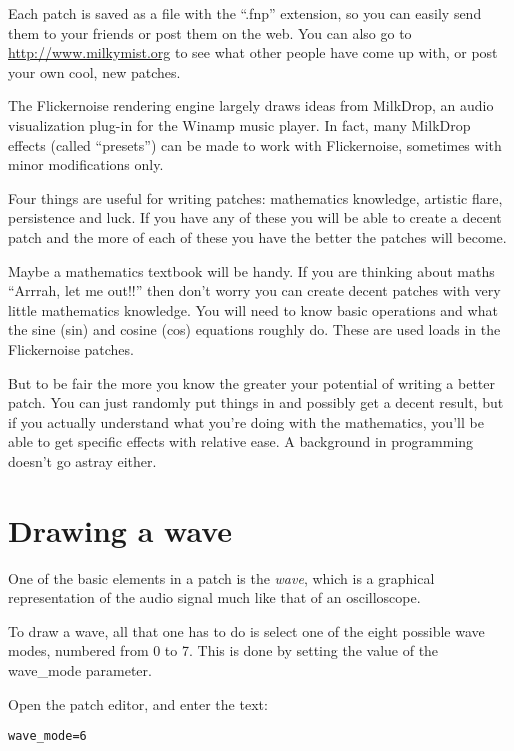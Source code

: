 \documentclass[11pt, a5paper, pagesize]{scrbook}
\begin{document}
Each patch is saved as a file with the ``.fnp'' extension, so you can easily send them to your friends or post them on the web. You can also go to \url{http://www.milkymist.org} to see what other people have come up with, or post your own cool, new patches.

The Flickernoise rendering engine largely draws ideas from MilkDrop, an audio visualization plug-in for the Winamp music player. In fact, many MilkDrop effects (called ``presets'') can be made to work with Flickernoise, sometimes with minor modifications only.

Four things are useful for writing patches: mathematics knowledge, artistic flare, persistence and luck. If you have any of these you will be able to create a decent patch and the more of each of these you have the better the patches will become. 

Maybe a mathematics textbook will be handy. If you are thinking about maths ``Arrrah, let me out!!'' then don't worry you can create decent patches with very little mathematics knowledge. You will need to know basic operations and what the sine (sin) and cosine (cos) equations roughly do. These are used loads in the Flickernoise patches.

But to be fair the more you know the greater your potential of writing a better patch. You can just randomly put things in and possibly get a decent result, but if you actually understand what you're doing with the mathematics, you'll be able to get specific effects with relative ease. A background in programming doesn't go astray either.

\section{Drawing a wave}
One of the basic elements in a patch is the \textit{wave}, which is a graphical representation of the audio signal much like that of an oscilloscope.

To draw a wave, all that one has to do is select one of the eight possible wave modes, numbered from 0 to 7. This is done by setting the value of the wave\_mode parameter.

Open the patch editor, and enter the text:

\begin{verbatim}
wave_mode=6
\end{verbatim}

\end{document}
